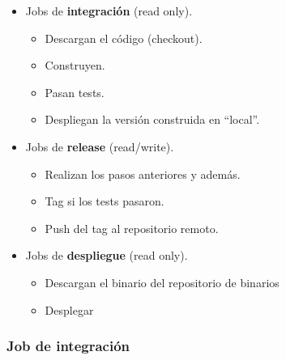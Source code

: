 \begin{itemize}
\item
  Jobs de \textbf{integración} (read only).
  \begin{itemize}
  \item
    Descargan el código (checkout).
  \item
    Construyen.
  \item
    Pasan tests.
  \item
    Despliegan la versión construida en ``local''.
  \end{itemize}
\item
  Jobs de \textbf{release} (read/write).
  \begin{itemize}
  \item
    Realizan los pasos anteriores y además.
  \item
    Tag si los tests pasaron.
  \item
    Push del tag al repositorio remoto.
  \end{itemize}
\item
  Jobs de \textbf{despliegue} (read only).
  \begin{itemize}
  \item
    Descargan el binario del repositorio de binarios
  \item
    Desplegar
  \end{itemize}
\end{itemize}
\subsubsection{Job de integración}

